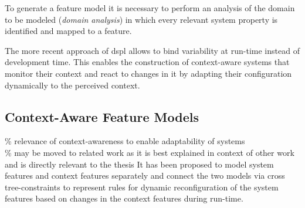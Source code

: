 To generate a feature model it is necessary to perform an analysis of the domain to be modeled (\textit{domain analysis}) in which every relevant system property is identified and mapped to a feature.

The more recent approach of \Gls{dspl} \cite{} allows to bind variability at run-time instead of development time. This enables the construction of context-aware systems that monitor their context and react to changes in it by adapting their configuration dynamically to the perceived context.

\subsection{Context-Aware Feature Models} 
\% relevance of context-awareness to enable adaptability of systems \\
\% may be moved to related work as it is best explained in context of other work and is directly relevant to the thesis
It has been proposed \cite{Acher2009} to model system features and context features separately and connect the two models via cross tree-constraints to represent rules for dynamic reconfiguration of the system features based on changes in the context features during run-time.



